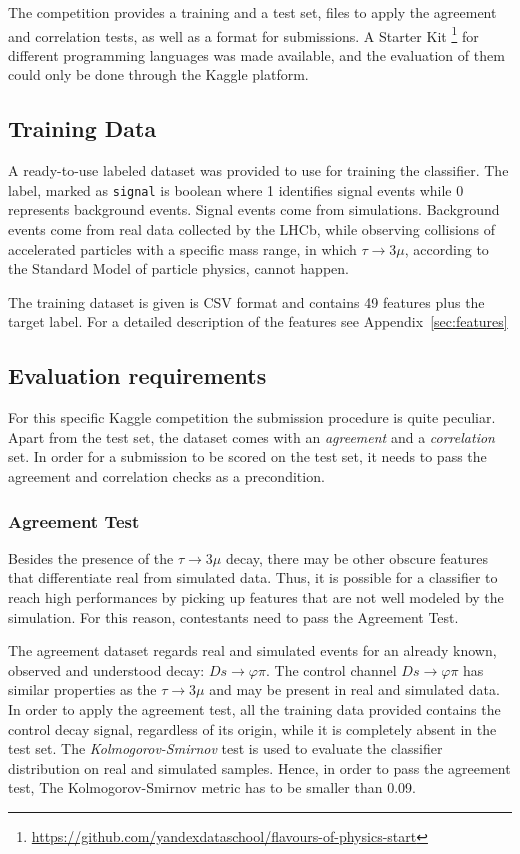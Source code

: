 \documentclass[conference]{IEEEtran}
\begin{document}
The competition provides a training and a test set, files to apply the agreement and correlation tests, as well as a format for submissions. A Starter Kit \footnote{\url{https://github.com/yandexdataschool/flavours-of-physics-start}} for different programming languages was made available, and the evaluation of them could only be done through the Kaggle platform.

\subsection{Training Data}
A ready-to-use labeled dataset was provided to use for training the classifier. The label, marked as \texttt{signal} is boolean where 1 identifies signal events while 0 represents background events. Signal events come from simulations. Background events come from real data collected by the LHCb, while observing collisions of accelerated particles with a specific mass range, in which $\tau \rightarrow 3\mu$, according to the Standard Model of particle physics, cannot happen.

The training dataset is given is CSV format and contains 49 features plus the target label. For a detailed description of the features see Appendix~\ref{sec:features}

\subsection{Evaluation requirements}
For this specific Kaggle competition the submission procedure is quite peculiar. Apart from the test set, the dataset comes with an \textit{agreement} and a \textit{correlation} set. In order for a submission to be scored on the test set, it needs to pass the agreement and correlation checks as a precondition.

\subsubsection{Agreement Test}
\label{sec:agreement}
Besides the presence of the $\tau \rightarrow 3\mu$ decay, there may be other obscure features that differentiate real from simulated data. Thus, it is possible for a classifier to reach high performances by picking up features that are not well modeled by the simulation. For this reason, contestants need to pass the Agreement Test.

The agreement dataset regards real and simulated events for an already known, observed and understood decay: $Ds \rightarrow \varphi\pi$. The control channel $Ds
\rightarrow \varphi\pi$ has similar properties as the $\tau \rightarrow 3\mu$ and may be present in real and simulated data. In order to apply the agreement test, all the training data provided contains the control decay signal, regardless of its origin, while it is completely absent in the test set. The \textit{Kolmogorov-Smirnov} test is used to evaluate the classifier distribution on real and simulated samples. Hence, in order to pass the agreement test, The Kolmogorov-Smirnov metric has to be smaller than 0.09.
\end{document}
